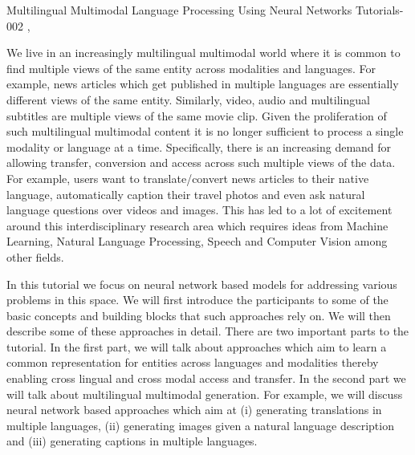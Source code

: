 \begin{tutorial}
  {Multilingual Multimodal Language Processing Using Neural Networks}
  {Tutorials-002}
  {\daydateyear, \tutorialmorningtime}
  {\TutLocB}

We live in an increasingly multilingual multimodal world where it is common to find multiple views of the same entity across modalities and languages. For example, news articles which get published in multiple languages are essentially different views of the same entity. Similarly, video, audio and multilingual subtitles are multiple views of the same movie clip. Given the proliferation of such multilingual multimodal content it is no longer sufficient to process a single modality or language at a time. Specifically, there is an increasing demand for allowing transfer, conversion and access across such multiple views of the data. For example, users want to translate/convert news articles to their native language, automatically caption their travel photos and even ask natural language questions over videos and images. This has led to a lot of excitement around this interdisciplinary research area which requires ideas from Machine Learning, Natural Language Processing, Speech and Computer Vision among other fields.

In this tutorial we focus on neural network based models for addressing various problems in this space. We will first introduce the participants to some of the basic concepts and building blocks that such approaches rely on. We will then describe some of these approaches in detail. There are two important parts to the tutorial. In the first part, we will talk about approaches which aim to learn a common representation for entities across languages and modalities thereby enabling cross lingual and cross modal access and transfer. In the second part we will talk about multilingual multimodal generation. For example, we will discuss neural network based approaches which aim at (i) generating translations in multiple languages, (ii) generating images given a natural language description and (iii) generating captions in multiple languages.

\end{tutorial}
